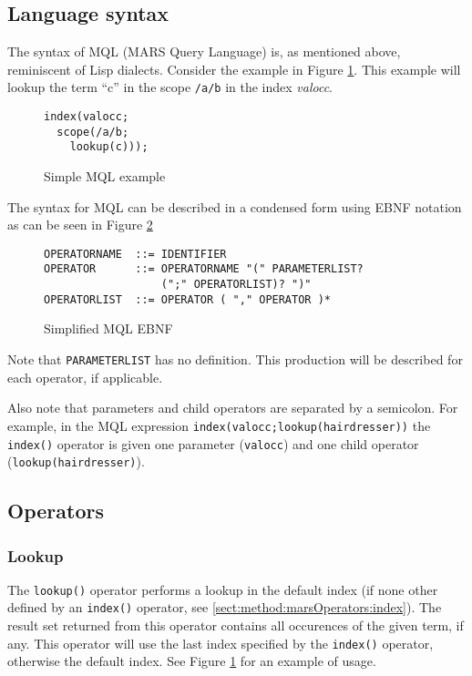 \subsection{Language syntax}
The syntax of MQL (MARS Query Language) is, as mentioned above, reminiscent of
Lisp dialects. Consider the example in Figure \ref{figure:mql:op_example}. This
example will lookup the term ``c'' in the scope \texttt{/a/b} in the index
\textit{valocc}.

\begin{figure}[!h]
\centering
\begin{Verbatim}
index(valocc; 
  scope(/a/b;
    lookup(c)));
\end{Verbatim}
\caption{Simple MQL example}
\label{figure:mql:op_example}
\end{figure}

The syntax for MQL can be described in a condensed form using EBNF notation as
can be seen in Figure \ref{figure:mql:ebnf}
\begin{figure}[!h]
\centering
\begin{Verbatim}
OPERATORNAME  ::= IDENTIFIER
OPERATOR      ::= OPERATORNAME "(" PARAMETERLIST? 
                  (";" OPERATORLIST)? ")"
OPERATORLIST  ::= OPERATOR ( "," OPERATOR )*
\end{Verbatim}
\caption{Simplified MQL EBNF}
\label{figure:mql:ebnf}
\end{figure}

Note that \texttt{PARAMETERLIST} has no definition. This production will be
described for each operator, if applicable.

Also note that parameters and child operators are separated by a semicolon. For
example, in the MQL expression \texttt{index(valocc;lookup(hairdresser))} the
\texttt{index()} operator is given one parameter (\texttt{valocc}) and one
child operator (\texttt{lookup(hairdresser)}).

\subsection{Operators}
\label{sect:method:marsOperators}
\subsubsection{Lookup}
\label{sect:method:marsOperators:lookup}
The \texttt{lookup()} operator performs a lookup in the default index (if none
other defined by an \texttt{index()} operator, see
\ref{sect:method:marsOperators:index}). The result set returned from this
operator contains all occurences of the given term, if any. This operator will
use the last index specified by the \texttt{index()} operator, otherwise the
default index. See Figure \ref{figure:mql:op_example} for an example of usage. 

